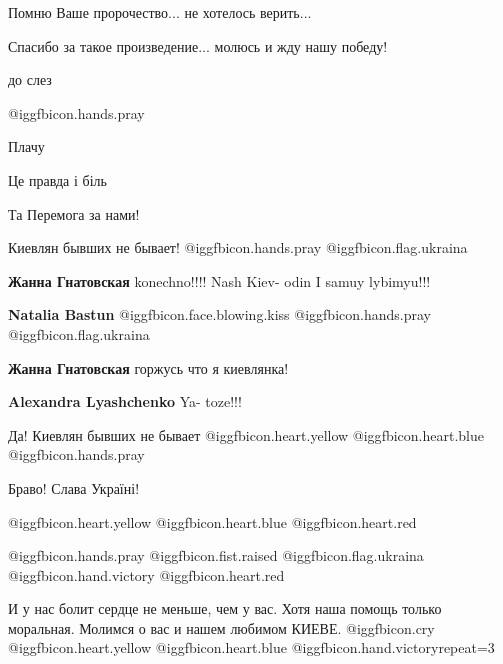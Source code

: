  
 
 
 
 
\zzSecCmt

\begin{itemize} %
Помню Ваше пророчество... не хотелось верить...

Спасибо за такое произведение... молюсь и жду нашу победу!

до слез

 @igg{fbicon.hands.pray} 

Плачу

Це правда і біль

Та Перемога за нами!

Киевлян бывших не бывает! @igg{fbicon.hands.pray} @igg{fbicon.flag.ukraina}

\begin{itemize} %
\textbf{Жанна Гнатовская} konechno!!!! Nash Kiev- odin I samuy lybimyu!!!

\textbf{Natalia Bastun}  @igg{fbicon.face.blowing.kiss}  @igg{fbicon.hands.pray} @igg{fbicon.flag.ukraina}

\textbf{Жанна Гнатовская} горжусь что я киевлянка!

\textbf{Alexandra Lyashchenko} Ya- toze!!!
\end{itemize} %

Да! Киевлян бывших не бывает  @igg{fbicon.heart.yellow}  @igg{fbicon.heart.blue}  @igg{fbicon.hands.pray} 

Браво! Слава Україні!

 @igg{fbicon.heart.yellow}  @igg{fbicon.heart.blue} @igg{fbicon.heart.red}

 @igg{fbicon.hands.pray}  @igg{fbicon.fist.raised} @igg{fbicon.flag.ukraina} @igg{fbicon.hand.victory}  @igg{fbicon.heart.red}

И у нас болит сердце не меньше, чем у вас. Хотя наша помощь только моральная. Молимся о вас и нашем любимом КИЕВЕ.  @igg{fbicon.cry}  @igg{fbicon.heart.yellow}  @igg{fbicon.heart.blue} @igg{fbicon.hand.victory}{repeat=3}


\end{itemize}
